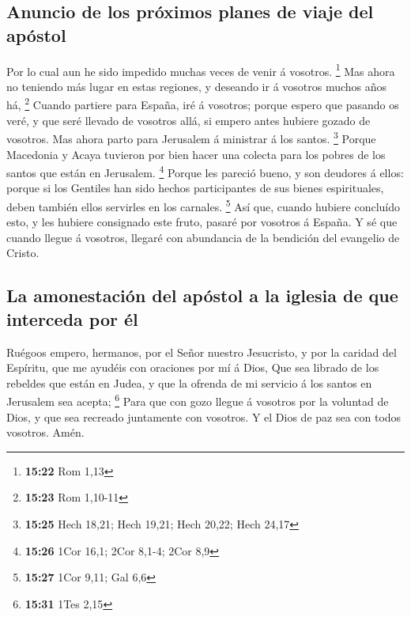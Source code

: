 \hypertarget{anuncio-de-los-pruxf3ximos-planes-de-viaje-del-apuxf3stol}{%
\subsection{Anuncio de los próximos planes de viaje del
apóstol}\label{anuncio-de-los-pruxf3ximos-planes-de-viaje-del-apuxf3stol}}

 Por lo cual aun he sido impedido muchas veces de venir á
vosotros. \footnote{\textbf{15:22} Rom 1,13}  Mas ahora
no teniendo más lugar en estas regiones, y deseando ir á vosotros muchos
años há, \footnote{\textbf{15:23} Rom 1,10-11}  Cuando
partiere para España, iré á vosotros; porque espero que pasando os veré,
y que seré llevado de vosotros allá, si empero antes hubiere gozado de
vosotros.  Mas ahora parto para Jerusalem á ministrar á
los santos. \footnote{\textbf{15:25} Hech 18,21; Hech 19,21; Hech 20,22;
  Hech 24,17}  Porque Macedonia y Acaya tuvieron por bien
hacer una colecta para los pobres de los santos que están en Jerusalem.
\footnote{\textbf{15:26} 1Cor 16,1; 2Cor 8,1-4; 2Cor 8,9}
 Porque les pareció bueno, y son deudores á ellos: porque
si los Gentiles han sido hechos participantes de sus bienes
espirituales, deben también ellos servirles en los carnales. \footnote{\textbf{15:27}
  1Cor 9,11; Gal 6,6}  Así que, cuando hubiere concluído
esto, y les hubiere consignado este fruto, pasaré por vosotros á España.
 Y sé que cuando llegue á vosotros, llegaré con
abundancia de la bendición del evangelio de Cristo.

\hypertarget{la-amonestaciuxf3n-del-apuxf3stol-a-la-iglesia-de-que-interceda-por-uxe9l}{%
\subsection{La amonestación del apóstol a la iglesia de que interceda
por
él}\label{la-amonestaciuxf3n-del-apuxf3stol-a-la-iglesia-de-que-interceda-por-uxe9l}}

 Ruégoos empero, hermanos, por el Señor nuestro
Jesucristo, y por la caridad del Espíritu, que me ayudéis con oraciones
por mí á Dios,  Que sea librado de los rebeldes que están
en Judea, y que la ofrenda de mi servicio á los santos en Jerusalem sea
acepta; \footnote{\textbf{15:31} 1Tes 2,15}  Para que con
gozo llegue á vosotros por la voluntad de Dios, y que sea recreado
juntamente con vosotros.  Y el Dios de paz sea con todos
vosotros. Amén.

